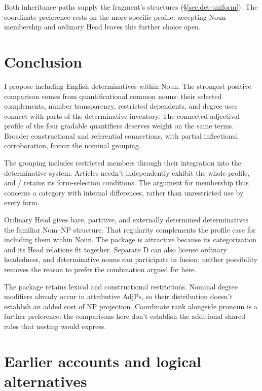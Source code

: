 \documentclass[12pt]{article}
\begin{document}
Both inheritance paths supply the fragment's structures (§\ref{sec:det-uniform}). The coordinate preference rests on the more specific profile; accepting Noun membership and ordinary Head leaves this further choice open.

\section{Conclusion}\label{sec:conclusion}

I propose including English determinatives within Noun. The strongest positive comparison comes from quantificational common nouns: their selected complements, number transparency, restricted dependents, and degree uses connect with parts of the determinative inventory. The connected adjectival profile of the four gradable quantifiers deserves weight on the same terms. Broader constructional and referential connections, with partial inflectional corroboration, favour the nominal grouping.

The grouping includes restricted members through their integration into the determinative system. Articles needn't independently exhibit the whole profile, and / retains its form-selection conditions. The argument for membership thus concerns a category with internal differences, rather than unrestricted use by every form.

Ordinary Head gives bare, partitive, and externally determined determinatives the familiar Nom--NP structure. That regularity complements the profile case for including them within Noun. The package is attractive because its categorization and its Head relations fit together. Separate D can also license ordinary headedness, and determinative nouns can participate in fusion; neither possibility removes the reason to prefer the combination argued for here.

The package retains lexical and constructional restrictions. Nominal degree modifiers already occur in attributive AdjPs, so their distribution doesn't establish an added cost of NP projection. Coordinate rank alongside pronoun is a further preference: the comparisons here don't establish the additional shared rules that nesting would express.

\appendix

\section{Earlier accounts and logical alternatives}\label{sec:historical}
\end{document}
